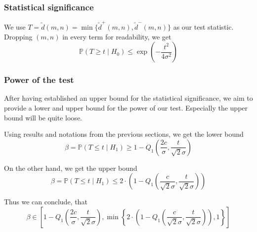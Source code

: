 \documentclass{beamer}
\begin{document}
\begin{frame}
	\subsubsection{Statistical significance}
	We use $T = \tilde{d}(m, n) = \min \{ \tilde{d}^+(m, n), \tilde{d}^-(m, n) \}$ as our test statistic. Dropping $(m, n)$ in every term for readability, we get
	\begin{equation*}
		\mathbb{P}(T \geq t \mid H_0) \leq \exp \left( - \frac{t^2}{4 \sigma^2} \right)
	\end{equation*}
\end{frame}

\begin{frame}
	\subsubsection{Power of the test}
	After having established an upper bound for the statistical significance, we aim to provide a lower and upper bound for the power of our test. Especially the upper bound will be quite loose.
	
	Using results and notations from the previous sections, we get the lower bound
	\begin{equation*}
		\beta = \mathbb{P}(T \leq t \mid H_1) \geq 1 - Q_1 \left( \frac{2 c}{\sigma}, \frac{t}{\sqrt{2} \sigma} \right)
	\end{equation*}
	
	On the other hand, we get the upper bound
	\begin{equation*}
		\beta = \mathbb{P}(T \leq t \mid H_1) \leq 2 \cdot \left( 1 - Q_1 \left( \frac{c}{\sqrt{2} \sigma}, \frac{t}{\sqrt{2} \sigma} \right) \right)
	\end{equation*}
	
	Thus we can conclude, that
	\begin{equation*}
		\beta \in \left[ 1 - Q_1 \left( \frac{2 c}{\sigma}, \frac{t}{\sqrt{2} \sigma} \right), \min \left\{ 2 \cdot \left( 1 - Q_1 \left( \frac{c}{\sqrt{2} \sigma}, \frac{t}{\sqrt{2} \sigma} \right) \right), 1 \right\} \right]
	\end{equation*}
\end{frame}
\end{document}
